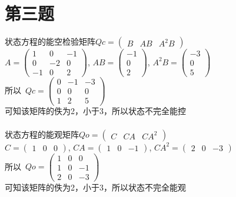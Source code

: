 \documentclass[a4paper]{article}
\begin{document}
\section*{第三题}
状态方程的能空检验矩阵$Qc=\left(\begin{array}{ccc} B & AB & A^{2}B \end{array}\right)$ \\
$A= \left(\begin{array}{ccc} 1 & 0 & -1\\ 0 & -2 & 0\\ -1 & 0 & 2 \end{array}\right) $,
$AB=  \left(\begin{array}{c} -1\\ 0\\ 2 \end{array}\right) $,
$A^{2}B=  \left(\begin{array}{c} -3\\ 0\\ 5 \end{array}\right) $ \\
\mbox{所以 }$Qc= \left(\begin{array}{ccc} 0 & -1 & -3\\ 0 & 0 & 0\\ 1 & 2 & 5 \end{array}\right) $
\\可知该矩阵的佚为2，小于3，所以状态不完全能控\\
\noindent\\
状态方程的能观矩阵$Qo=\left(\begin{array}{ccc} C & CA & CA^{2} \end{array}\right) $
\\ $C= \left(\begin{array}{ccc} 1 & 0 & 0 \end{array}\right)$, 
$CA=\left(\begin{array}{ccc} 1 & 0 & -1 \end{array}\right)$,
$CA^{2}=\left(\begin{array}{ccc} 2 & 0 & -3 \end{array}\right)$ \\
\mbox{所以 }$Qo=\left(\begin{array}{ccc} 1 & 0 & 0\\ 1 & 0 & -1\\ 2 & 0 & -3 \end{array}\right)$
\\可知该矩阵的佚为2，小于3，所以状态不完全能观
\end{document}

